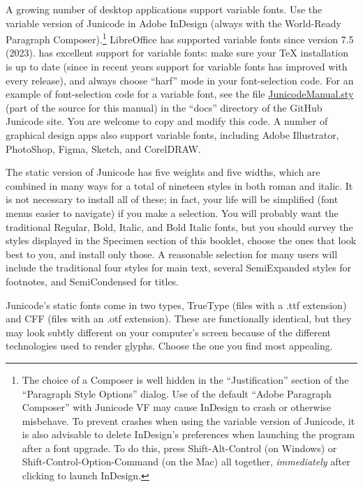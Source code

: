 A growing number of desktop applications support variable fonts. Use the variable version of
Junicode in Adobe InDesign (always with the World-Ready Paragraph Composer).\footnote{%
The choice of a Composer is well hidden in the “Justification” section of the
“Paragraph Style Options” dialog. Use of the default “Adobe Paragraph Composer”
with Junicode VF may cause InDesign to crash or otherwise misbehave. To prevent crashes
when using the variable version of Junicode,
it is also advisable to delete InDesign's preferences when launching the program after
a font upgrade. To do this, press Shift-Alt-Control (on Windows) or
Shift-Control-Option-Command (on the Mac) all together, \textit{immediately} after
clicking to launch InDesign.} LibreOffice
has supported variable fonts since version 7.5 (2023). {\LuaTeX} has excellent support
for variable fonts: make sure your TeX installation is up to date (since in
recent years support for variable fonts has improved with every release), and always choose “harf”
mode in your font-selection code. For an example of font-selection code for a
variable font, see the file
\href{https://github.com/psb1558/Junicode-font/blob/master/docs/JunicodeManual.sty}%
{JunicodeManual.sty} (part of the source for this manual) in the “docs” directory of the GitHub Junicode site.
You are welcome to copy and modify this code. A number of graphical design apps 
also support variable fonts, including Adobe Illustrator, PhotoShop, Figma,
Sketch, and CorelDRAW.

The static version of Junicode has five weights and five widths, which are combined in many ways
for a total of nineteen styles in
both roman and italic. It is not necessary to install all of these; in fact,
your life will be simplified (font menus easier to navigate) if you
make a selection. You will probably want the traditional Regular, Bold, Italic, and Bold
Italic fonts, but you should survey the styles displayed in the Specimen
section of this booklet, choose the ones that look best to you, and install
only those. A reasonable selection for many users will include the traditional four
styles for main text, several SemiExpanded styles for footnotes, and
SemiCondensed for titles.

Junicode’s static fonts come in two types, TrueType (files with a .ttf extension) and
CFF (files with an .otf extension). These are functionally identical, but they may look
subtly different on your computer’s screen because of the different technologies used to
render glyphs. Choose the one you find most appealing.

